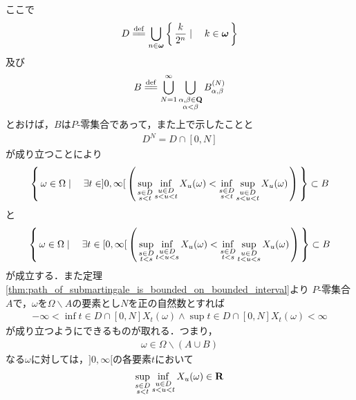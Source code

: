  	ここで
 	\begin{align}
 		D \defeq \bigcup_{n \in \Natural} \Set{\frac{k}{2^n}}{k \in \Natural}
 	\end{align}
 	及び
 	\begin{align}
 		B \defeq \bigcup_{N=1}^\infty \bigcup_{\substack{\alpha,\beta \in \Q \\ \alpha < \beta}} B_{\alpha,\beta}^{(N)}
 	\end{align}
 	とおけば，$B$は$P$-零集合であって，また上で示したことと
 	\begin{align}
 		D^N = D \cap [0,N]
 	\end{align}
 	が成り立つことにより
 	\begin{align}
 		\left\{\, \omega \in \Omega \mid \quad \exists t \in ]0,\infty[\, \left(\, 
 		\operatorname*{sup}_{\substack{s \in D \\ s < t}} \operatorname*{inf}_{\substack{u \in D \\ s < u < t}} X_u(\omega) 
 		< \operatorname*{inf}_{\substack{s \in D \\ s < t}} \operatorname*{sup}_{\substack{u \in D \\ s < u < t}} X_u(\omega)\, \right)\, \right\}
 		\subset B
 	\end{align}
 	と
 	\begin{align}
 		\left\{\, \omega \in \Omega \mid \quad \exists t \in [0,\infty[\, \left(\, 
 		\operatorname*{sup}_{\substack{s \in D \\ t < s}} \operatorname*{inf}_{\substack{u \in D \\ t < u < s}} X_u(\omega) 
 		< \operatorname*{inf}_{\substack{s \in D \\ t < s}} \operatorname*{sup}_{\substack{u \in D \\ t < u < s}} X_u(\omega)\, \right)\, \right\}
 		\subset B
 	\end{align}
 	が成立する．また定理\ref{thm:path_of_submartingale_is_bounded_on_bounded_interval}より
 	$P$-零集合$A$で，$\omega$を$\Omega \backslash A$の要素とし$N$を正の自然数とすれば
	\begin{align}
		- \infty < \inf{t \in D \cap [0,N]}X_t(\omega) \wedge \sup{t \in D \cap [0,N]}X_t(\omega) < \infty
	\end{align}
	が成り立つようにできるものが取れる．つまり，
	\begin{align}
		\omega \in \Omega \backslash (A \cup B)
	\end{align}
	なる$\omega$に対しては，$]0,\infty[$の各要素$t$において
	\begin{align}
		\operatorname*{sup}_{\substack{s \in D \\ s < t}} \operatorname*{inf}_{\substack{u \in D \\ s < u < t}} X_u(\omega) \in \mathbf{R}
	\end{align}
